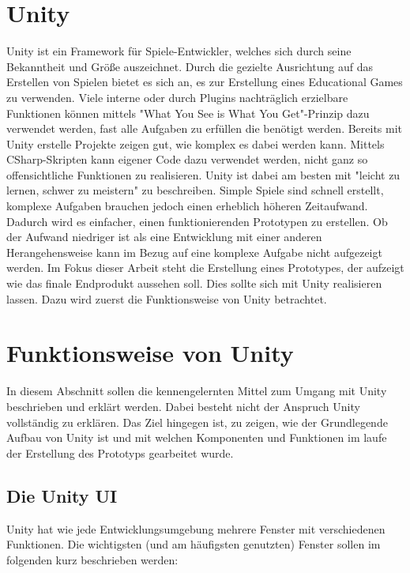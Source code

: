 \section{Unity}

Unity ist ein Framework für Spiele-Entwickler, welches sich durch seine Bekanntheit und Größe auszeichnet. Durch die gezielte Ausrichtung auf das Erstellen von Spielen bietet es sich an, es zur Erstellung eines Educational Games zu verwenden. Viele interne oder durch Plugins nachträglich erzielbare Funktionen können mittels "What You See is What You Get"-Prinzip dazu verwendet werden, fast alle Aufgaben zu erfüllen die benötigt werden. Bereits mit Unity erstelle Projekte zeigen gut, wie komplex es dabei werden kann. Mittels CSharp-Skripten kann eigener Code dazu verwendet werden, nicht ganz so offensichtliche Funktionen zu realisieren. Unity ist dabei am besten mit "leicht zu lernen, schwer zu meistern" zu beschreiben. Simple Spiele sind schnell erstellt, komplexe Aufgaben brauchen jedoch einen erheblich höheren Zeitaufwand. Dadurch wird es einfacher, einen funktionierenden Prototypen zu erstellen. Ob der Aufwand niedriger ist als eine Entwicklung mit einer anderen Herangehensweise kann im Bezug auf eine komplexe Aufgabe nicht aufgezeigt werden. Im Fokus dieser Arbeit steht die Erstellung eines Prototypes, der aufzeigt wie das finale Endprodukt aussehen soll. Dies sollte sich mit Unity realisieren lassen. Dazu wird zuerst die Funktionsweise von Unity betrachtet.

\newpage

\section{Funktionsweise von Unity}

In diesem Abschnitt sollen die kennengelernten Mittel zum Umgang mit Unity beschrieben und erklärt werden. Dabei besteht nicht der Anspruch Unity vollständig zu erklären. Das Ziel hingegen ist, zu zeigen, wie der Grundlegende Aufbau von Unity ist und mit welchen Komponenten und Funktionen im laufe der Erstellung des Prototyps gearbeitet wurde.

\subsection{Die Unity UI}

Unity hat wie jede Entwicklungsumgebung mehrere Fenster mit verschiedenen Funktionen. Die wichtigsten (und am häufigsten genutzten) Fenster sollen im folgenden kurz beschrieben werden:

